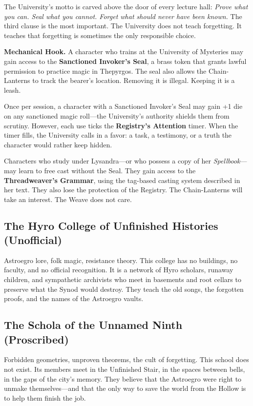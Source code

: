 \documentclass[10pt,twocolumn]{book}
\begin{document}
The University's motto is carved above the door of every lecture hall: \textit{Prove what you can. Seal what you cannot. Forget what should never have been known.} The third clause is the most important. The University does not teach forgetting. It teaches that forgetting is sometimes the only responsible choice.

\noindent\textbf{Mechanical Hook.} A character who trains at the University of Mysteries may gain access to the \textbf{Sanctioned Invoker's Seal}, a brass token that grants lawful permission to practice magic in Thepyrgos. The seal also allows the Chain-Lanterns to track the bearer's location. Removing it is illegal. Keeping it is a leash.

Once per session, a character with a Sanctioned Invoker's Seal may gain +1 die on any sanctioned magic roll---the University's authority shields them from scrutiny. However, each use ticks the \textbf{Registry's Attention} timer. When the timer fills, the University calls in a favor: a task, a testimony, or a truth the character would rather keep hidden.

Characters who study under Lysandra---or who possess a copy of her \textit{Spellbook}---may learn to free cast without the Seal. They gain access to the \textbf{Threadweaver's Grammar}, using the tag-based casting system described in her text. They also lose the protection of the Registry. The Chain-Lanterns will take an interest. The Weave does not care.

\subsection{The Hyro College of Unfinished Histories (Unofficial)}

Astroegro lore, folk magic, resistance theory. This college has no buildings, no faculty, and no official recognition. It is a network of Hyro scholars, runaway children, and sympathetic archivists who meet in basements and root cellars to preserve what the Synod would destroy. They teach the old songs, the forgotten proofs, and the names of the Astroegro vaults.

\subsection{The Schola of the Unnamed Ninth (Proscribed)}

Forbidden geometries, unproven theorems, the cult of forgetting. This school does not exist. Its members meet in the Unfinished Stair, in the spaces between bells, in the gaps of the city's memory. They believe that the Astroegro were right to unmake themselves---and that the only way to save the world from the Hollow is to help them finish the job.
\end{document}
